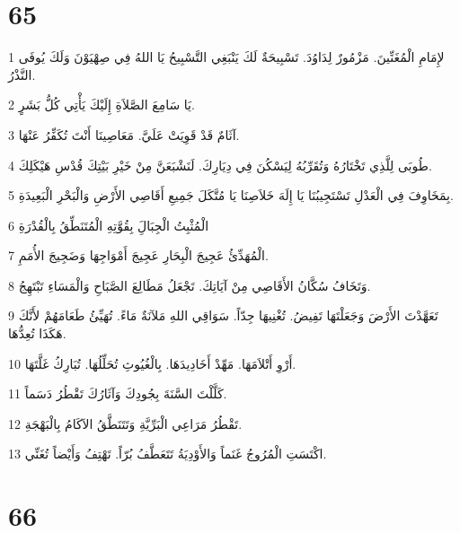 \chapter{65}

\par 1 لإِمَامِ الْمُغَنِّينَ. مَزْمُورٌ لِدَاوُدَ. تَسْبِيحَةٌ لَكَ يَنْبَغِي التَّسْبِيحُ يَا اللهُ فِي صِهْيَوْنَ وَلَكَ يُوفَى النَّذْرُ.
\par 2 يَا سَامِعَ الصَّلاَةِ إِلَيْكَ يَأْتِي كُلُّ بَشَرٍ.
\par 3 آثَامٌ قَدْ قَوِيَتْ عَلَيَّ. مَعَاصِينَا أَنْتَ تُكَفِّرُ عَنْهَا.
\par 4 طُوبَى لِلَّذِي تَخْتَارُهُ وَتُقَرِّبُهُ لِيَسْكُنَ فِي دِيَارِكَ. لَنَشْبَعَنَّ مِنْ خَيْرِ بَيْتِكَ قُدْسِ هَيْكَلِكَ.
\par 5 بِمَخَاوِفَ فِي الْعَدْلِ تَسْتَجِيبُنَا يَا إِلَهَ خَلاَصِنَا يَا مُتَّكَلَ جَمِيعِ أَقَاصِي الأَرْضِ وَالْبَحْرِ الْبَعِيدَةِ.
\par 6 الْمُثْبِتُ الْجِبَالَِ بِقُوَّتِهِ الْمُتَنَطِّقُ بِالْقُدْرَةِ
\par 7 الْمُهَدِّئُ عَجِيجَ الْبِحَارِ عَجِيجَ أَمْوَاجِهَا وَضَجِيجَ الأُمَمِ.
\par 8 وَتَخَافُ سُكَّانُ الأَقَاصِي مِنْ آيَاتِكَ. تَجْعَلُ مَطَالِعَ الصَّبَاحِ وَالْمَسَاءِ تَبْتَهِجُ.
\par 9 تَعَهَّدْتَ الأَرْضَ وَجَعَلْتَهَا تَفِيضُ. تُغْنِيهَا جِدّاً. سَوَاقِي اللهِ مَلآنَةٌ مَاءً. تُهَيِّئُ طَعَامَهُمْ لأَنَّكَ هَكَذَا تُعِدُّهَا.
\par 10 أَرْوِ أَتْلاَمَهَا. مَهِّدْ أَخَادِيدَهَا. بِالْغُيُوثِ تُحَلِّلُهَا. تُبَارِكُ غَلَّتَهَا.
\par 11 كَلَّلْتَ السَّنَةَ بِجُودِكَ وَآثَارُكَ تَقْطُرُ دَسَماً.
\par 12 تَقْطُرُ مَرَاعِي الْبَرِّيَّةِ وَتَتَنَطَّقُ الآكَامُ بِالْبَهْجَةِ.
\par 13 اكْتَسَتِ الْمُرُوجُ غَنَماً وَالأَوْدِيَةُ تَتَعَطَّفُ بُرّاً. تَهْتِفُ وَأَيْضاً تُغَنِّي.

\chapter{66}

